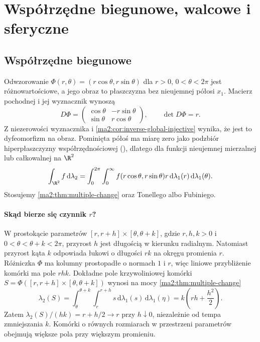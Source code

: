 \section{Współrzędne biegunowe, walcowe i sferyczne}

\subsection{Współrzędne biegunowe}

Odwzorowanie
$\Phi(r,\theta)=(r\cos\theta,r\sin\theta)$
dla $r>0$, $0<\theta<2\pi$ jest różnowartościowe,
a jego obraz to płaszczyzna bez nieujemnej półosi
$x_1$. Macierz pochodnej i jej wyznacznik wynoszą
\[
 D\Phi=
 \begin{pmatrix}\cos\theta&-r\sin\theta\\
 \sin\theta&r\cos\theta\end{pmatrix},
 \qquad \det D\Phi=r.
\]
Z niezerowości wyznacznika i
\ref{ma2:cor:inverse-global-injective}
wynika, że jest to dyfeomorfizm na obraz.
Pominięta półoś ma miarę zero jako podzbiór
hiperpłaszczyzny współrzędnościowej
(),
dlatego dla funkcji
nieujemnej mierzalnej lub całkowalnej na $\R^2$
\begin{equation}
 \label{ma2:eq:multiple-polar}
 \int_{\R^2}f\,\mathrm d\lambda_2
 =\int_0^{2\pi}\int_0^\infty
 f(r\cos\theta,r\sin\theta)r\,
 \mathrm d\lambda_1(r)\,\mathrm d\lambda_1(\theta).
\end{equation}
Stosujemy \ref{ma2:thm:multiple-change}
oraz Tonellego albo Fubiniego.

\paragraph{Skąd bierze się czynnik $r$?}
W prostokącie parametrów
$[r,r+h]\times[\theta,\theta+k]$,
gdzie $r,h,k>0$ i
$0<\theta<\theta+k<2\pi$,
przyrost $h$ jest długością w kierunku
radialnym. Natomiast przyrost kąta $k$
odpowiada łukowi o długości $rk$
na okręgu promienia $r$.
Różniczka $\Phi$ ma kolumny
prostopadłe o normach $1$ i $r$,
więc liniowe przybliżenie komórki
ma pole $rhk$.
Dokładne pole krzywoliniowej komórki
$S=\Phi([r,r+h]\times[\theta,\theta+k])$
wynosi na mocy
\ref{ma2:thm:multiple-change}
\[
 \lambda_2(S)=\int_\theta^{\theta+k}
 \int_r^{r+h}s\,\mathrm d\lambda_1(s)
 \,\mathrm d\lambda_1(\eta)
 =k\left(rh+\frac{h^2}{2}\right).
\]
Zatem $\lambda_2(S)/(hk)=r+h/2\to r$
przy $h\downarrow0$, niezależnie od
tempa zmniejszania $k$.
Komórki o równych rozmiarach
w przestrzeni parametrów obejmują
większe pola przy większym promieniu.

